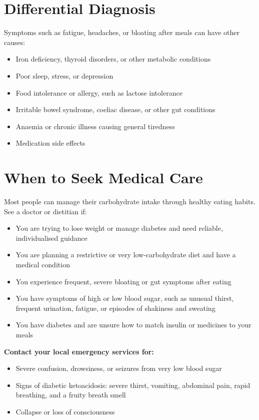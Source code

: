 \section*{Differential Diagnosis}
Symptoms such as fatigue, headaches, or bloating after meals can have other causes:
\begin{itemize}
    \item Iron deficiency, thyroid disorders, or other metabolic conditions
    \item Poor sleep, stress, or depression
    \item Food intolerance or allergy, such as lactose intolerance
    \item Irritable bowel syndrome, coeliac disease, or other gut conditions
    \item Anaemia or chronic illness causing general tiredness
    \item Medication side effects
\end{itemize}

\section*{When to Seek Medical Care}
Most people can manage their carbohydrate intake through healthy eating habits. See a doctor or dietitian if:
\begin{itemize}
    \item You are trying to lose weight or manage diabetes and need reliable, individualised guidance
    \item You are planning a restrictive or very low-carbohydrate diet and have a medical condition
    \item You experience frequent, severe bloating or gut symptoms after eating
    \item You have symptoms of high or low blood sugar, such as unusual thirst, frequent urination, fatigue, or episodes of shakiness and sweating
    \item You have diabetes and are unsure how to match insulin or medicines to your meals
\end{itemize}
\textbf{Contact your local emergency services for:}
\begin{itemize}
    \item Severe confusion, drowsiness, or seizures from very low blood sugar
    \item Signs of diabetic ketoacidosis: severe thirst, vomiting, abdominal pain, rapid breathing, and a fruity breath smell
    \item Collapse or loss of consciousness
\end{itemize}


